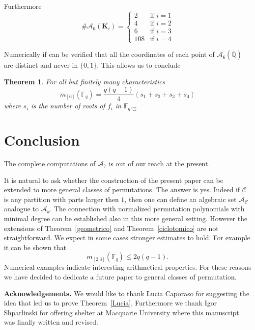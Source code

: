 \documentclass[a4paper,twoside]{article}
\newtheorem{Theorem}{Theorem}[section]
\begin{document}
Furthermore
$$\#\mathcal A_6({\mathbf K}_i)=\left\{
\begin{array}{rl}
2   & \text{if $i=1$}\\
4   & \text{if $i=2$}\\
6   & \text{if $i=3$}\\
108 & \text{if $i=4$}
\end{array}
\right.
$$


Numerically if can be verified that all the coordinates of each
point of $\mathcal A_6(\overline{\mathbb Q})$ are distinct and
never in $\{0,1\}$. This allows us to conclude

\begin{Theorem} For all but finitely many characteristics
$$m_{[6]}(\mathbb F_q)=\frac{q(q-1)}{4}(s_1+s_2+s_3+s_4)$$
where $s_i$ is the number of roots of $f_i$ in $\mathbb F_q$.\hfill$_\Box$
\end{Theorem}

\section{Conclusion}

The complete computations of $\mathcal A_7$ is out of our reach
at the present.

It is natural to ask whether the construction of the present paper
can be extended to more general classes of permutations. The
answer is yes. Indeed if $\mathcal C$ is any partition with parts
larger then $1$, then one can define an algebraic set $\mathcal
A_{\mathcal C}$ analogue to $\mathcal A_k$. The connection with
normalized permutation polynomials with minimal degree can be
established also in this more general setting. However the
extensions of Theorem~\ref{geometrico} and
Theorem~\ref{ciclotomico} are not straightforward. We expect in
some cases stronger estimates to hold. For example it can be shown
that
$$m_{[2\ 3]}(\mathbb F_q)\leq 2q(q-1).$$
Numerical examples indicate interesting arithmetical properties.
For these reasons we have decided to dedicate a future paper to
general classes of permutation.
\bigskip

\noindent\textbf{Acknowledgements.} We would like to thank Lucia
Caporaso for suggesting the idea that led us to prove
Theorem~\ref{Lucia}, Furthermore we thank Igor Shparlinski for
offering shelter at Macquarie University where this manuscript was
finally written and revised.\bigskip
\end{document}
